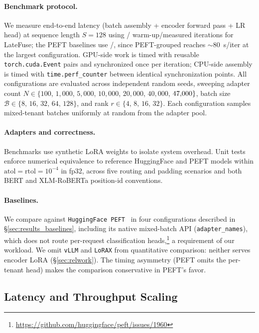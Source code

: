 \documentclass[11pt]{article}
\newcommand{\sysname}{LateFuse}
\begin{document}
\paragraph{Benchmark protocol.}
We measure end-to-end latency (batch assembly + encoder forward pass + LR head) at
sequence length $S{=}128$
using \SysWarmup{}/\SysIters{} warm-up/measured iterations for \sysname{}; the
PEFT baselines use \PeftWarmup{}/\PeftIters{}, since PEFT-grouped reaches
$\sim$80~s/iter at the largest configuration.
GPU-side work is timed with reusable \texttt{torch.cuda.Event} pairs and
synchronized once per iteration; CPU-side assembly is timed with
\texttt{time.perf\_counter} between identical synchronization points.
All configurations are evaluated across \SweepNumSeeds{} independent random seeds,
sweeping adapter count $N \in \{100$, $1{,}000$, $5{,}000$, $10{,}000$,
$20{,}000$, $40{,}000$, $47{,}000\}$,
batch size $\mathcal{B} \in \{8,\,16,\,32,\,64,\,128\}$, and rank
$r \in \{4,\,8,\,16,\,32\}$.
Each configuration samples mixed-tenant batches uniformly at random from the
adapter pool.

\paragraph{Adapters and correctness.}
Benchmarks use synthetic LoRA weights to isolate system overhead. Unit tests
enforce numerical equivalence to reference HuggingFace and PEFT models within
$\text{atol}=\text{rtol}=10^{-4}$ in fp32, across five routing and padding
scenarios and both BERT and XLM-RoBERTa position-id conventions.

\paragraph{Baselines.}
We compare against \texttt{HuggingFace PEFT}~\cite{mangrulkar2022peft} in
four configurations described in \S\ref{sec:results_baselines}, including
its native mixed-batch API (\texttt{adapter\_names}), which does not route
per-request classification
heads,\footnote{\url{https://github.com/huggingface/peft/issues/1960}}
a requirement of our workload.
We omit \texttt{vLLM} and \texttt{LoRAX}
from quantitative comparison: neither serves encoder
LoRA (\S\ref{sec:relwork}).
The timing asymmetry (PEFT omits the per-tenant head) makes the
comparison conservative in PEFT's favor.

\subsection{Latency and Throughput Scaling}
\label{sec:results_latency}
\end{document}

